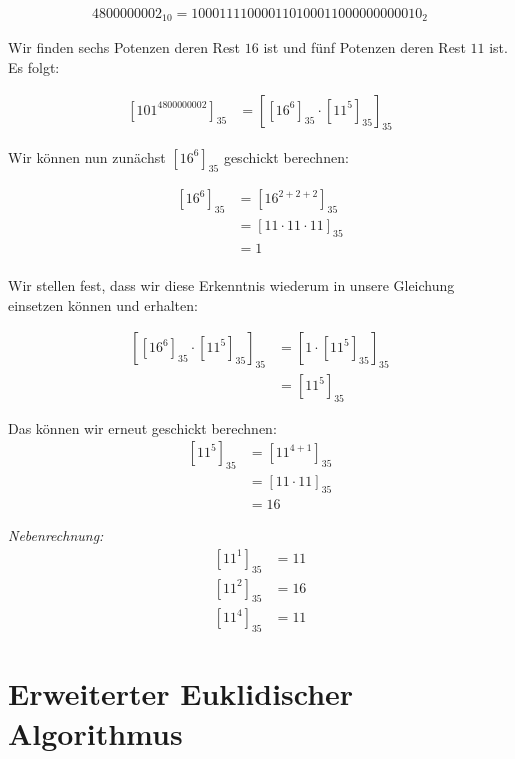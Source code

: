 \documentclass{../crypto}
\begin{document}
\begin{align*}4800000002_{10} = 1 00 01 11 10 00 01 10 10 00 11 00 00 00 00 00 10_2\end{align*}

Wir finden sechs Potenzen deren Rest $16$ ist und fünf Potenzen deren Rest $11$ 
ist. Es folgt:

\begin{align*}
  \left[101^{4800000002}\right]_{35} &= \left[ \left[16^6\right]_{35} 
                                         \cdot \left[11^5\right]_{35}
                                        \right]_{35}
\end{align*}

Wir können nun zunächst $\left[16^6\right]_{35}$ geschickt berechnen:

\begin{align*}
  \left[16^6\right]_{35} &= \left[16^{2+2+2}\right]_{35} \\
                         &= \left[11 \cdot 11 \cdot 11\right]_{35} \\
                         &= 1 \\
\end{align*}

Wir stellen fest, dass wir diese Erkenntnis wiederum in unsere Gleichung 
einsetzen können und erhalten:

\begin{align*}
  \left[ \left[16^6\right]_{35} \cdot \left[11^5\right]_{35} \right]_{35} 
                    &= \left[1 \cdot \left[11^5\right]_{35} \right]_{35} \\
                    &= \left[11^5\right]_{35}
\end{align*}

Das können wir erneut geschickt berechnen:
\begin{align*}
  \left[11^{5}\right]_{35} &= \left[11^{4+1}\right]_{35} \\
                           &= \left[11 \cdot 11\right]_{35} \\
                           &= 16
\end{align*}
  
\emph{Nebenrechnung:}
\begin{align*}
  \left[11^{1}\right]_{35} &= 11 \\
  \left[11^{2}\right]_{35} &= 16 \\
  \left[11^{4}\right]_{35} &= 11
\end{align*}

\section{Erweiterter Euklidischer Algorithmus}
\end{document}
